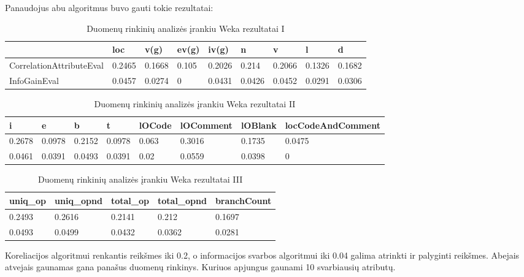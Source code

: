 \documentclass{VUMIFPSbakalaurinis}
\begin{document}
Panaudojus abu algoritmus buvo gauti tokie rezultatai:

\begin{table}[H]
\centering
\caption{Duomenų rinkinių analizės įrankiu Weka rezultatai I}
\label{tab:weka_1}
\begin{tabular}{lllllllll}
\hline
\multicolumn{1}{|l}{}                         & loc    & v(g)   & ev(g) & iv(g)  & n      & v      & l      & \multicolumn{1}{l|}{d}      \\ \hline
\multicolumn{1}{|l}{CorrelationAttributeEval} & 0.2465 & 0.1668 & 0.105 & 0.2026 & 0.214  & 0.2066 & 0.1326 & \multicolumn{1}{l|}{0.1682} \\
\multicolumn{1}{|l}{InfoGainEval}             & 0.0457 & 0.0274 & 0     & 0.0431 & 0.0426 & 0.0452 & 0.0291 & \multicolumn{1}{l|}{0.0306} \\ \hline                     
\end{tabular}
\end{table}

\begin{table}[H]
\centering
\caption{Duomenų rinkinių analizės įrankiu Weka rezultatai II}
\label{tab:weka_2}
\begin{tabular}{|llllllll|}
\hline
i & e & b & t & lOCode & lOComment & lOBlank & locCodeAndComment \\ \hline
0.2678 & 0.0978 & 0.2152 & 0.0978 & 0.063 & 0.3016 & 0.1735 & 0.0475 \\
0.0461 & 0.0391 & 0.0493 & 0.0391 & 0.02 & 0.0559 & 0.0398 & 0 \\ \hline
\end{tabular}
\end{table}

\begin{table}[H]
\centering
\caption{Duomenų rinkinių analizės įrankiu Weka rezultatai III}
\label{tab:weka_3}
\begin{tabular}{|lllll|}
\hline
uniq\_op & uniq\_opnd & total\_op & total\_opnd & branchCount \\ \hline
0.2493   & 0.2616     & 0.2141    & 0.212       & 0.1697      \\
0.0493   & 0.0499     & 0.0432    & 0.0362      & 0.0281      \\ \hline
\end{tabular}
\end{table}
Koreliacijos algoritmui renkantis reikšmes iki 0.2, o informacijos svarbos algoritmui iki 0.04 galima atrinkti ir palyginti reikšmes. Abejais atvejais gaunamas gana panašus duomenų rinkinys. Kuriuos apjungus gaunami 10 svarbiausių atributų.
\end{document}
